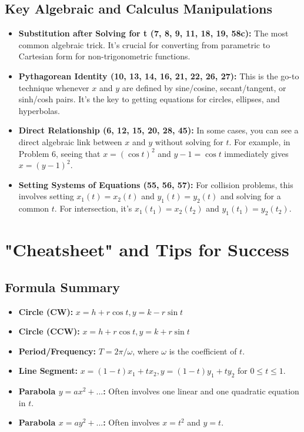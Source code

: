 \documentclass{article}
\begin{document}
\subsection{Key Algebraic and Calculus Manipulations}
\begin{itemize}
    \item \textbf{Substitution after Solving for t (7, 8, 9, 11, 18, 19, 58c):} The most common algebraic trick. It's crucial for converting from parametric to Cartesian form for non-trigonometric functions.
    \item \textbf{Pythagorean Identity (10, 13, 14, 16, 21, 22, 26, 27):} This is the go-to technique whenever \(x\) and \(y\) are defined by sine/cosine, secant/tangent, or sinh/cosh pairs. It's the key to getting equations for circles, ellipses, and hyperbolas.
    \item \textbf{Direct Relationship (6, 12, 15, 20, 28, 45):} In some cases, you can see a direct algebraic link between \(x\) and \(y\) without solving for \(t\). For example, in Problem 6, seeing that \(x = (\cos t)^2\) and \(y-1=\cos t\) immediately gives \(x=(y-1)^2\).
    \item \textbf{Setting Systems of Equations (55, 56, 57):} For collision problems, this involves setting \(x_1(t) = x_2(t)\) and \(y_1(t) = y_2(t)\) and solving for a common \(t\). For intersection, it's \(x_1(t_1) = x_2(t_2)\) and \(y_1(t_1) = y_2(t_2)\).
\end{itemize}

\section{"Cheatsheet" and Tips for Success}
\subsection{Formula Summary}
\begin{itemize}
    \item \textbf{Circle (CW):} \(x=h+r\cos t, y=k-r\sin t\)
    \item \textbf{Circle (CCW):} \(x=h+r\cos t, y=k+r\sin t\)
    \item \textbf{Period/Frequency:} \(T = 2\pi/\omega\), where \(\omega\) is the coefficient of \(t\).
    \item \textbf{Line Segment:} \(x=(1-t)x_1+tx_2, y=(1-t)y_1+ty_2\) for \(0 \le t \le 1\).
    \item \textbf{Parabola \(y=ax^2+...\):} Often involves one linear and one quadratic equation in \(t\).
    \item \textbf{Parabola \(x=ay^2+...\):} Often involves \(x=t^2\) and \(y=t\).
\end{itemize}
\end{document}
